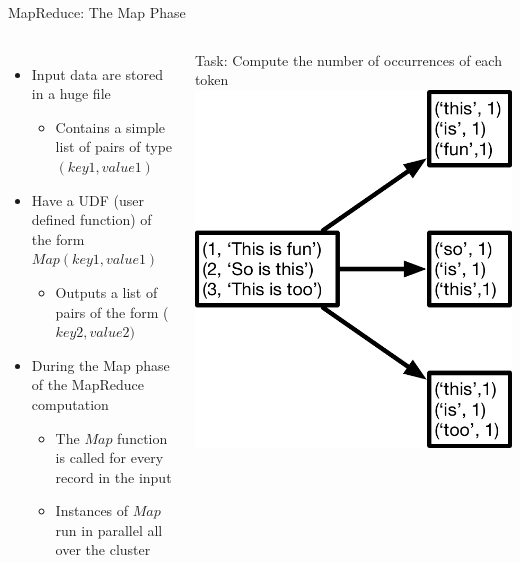 \documentclass[aspectratio=169]{beamer}
\begin{document}
\begin{frame}{MapReduce: The Map Phase}
\begin{columns}[c]
\begin{itemize}
\item Input data are stored in a huge file
        \begin{itemize}
        \item Contains a simple list of pairs of type $(key1,value1)$
        \end{itemize}
\item Have a UDF (user defined function) of the form $Map(key1,value1)$
        \begin{itemize}
        \item Outputs a list of pairs of the form ($key2, value2)$
        \end{itemize}
\item During the Map phase of the MapReduce computation
        \begin{itemize}
        \item The $Map$ function is called for every record in the input 
	\item Instances of $Map$ run in parallel all over the cluster
        \end{itemize}
\end{itemize}
Task: Compute the number of occurrences of each token
    	{\includegraphics[width=1\textwidth]{./lectBigData/map.pdf}} \\
\end{columns}
\end{frame}
\end{document}
